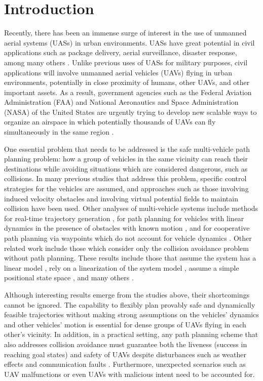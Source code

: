 \section{Introduction}
Recently, there has been an immense surge of interest in the use of unmanned aerial systems (UASs) in urban environments. UASs have great potential in civil applications such as package delivery, aerial surveillance, disaster response, among many others \cite{Tice91, Debusk10, Amazon16, AUVSI16, BBC16}. Unlike previous uses of UASs for military purposes, civil applications will involve unmanned aerial vehicles (UAVs) flying in urban environments, potentially in close proximity of humans, other UAVs, and other important assets. As a result, government agencies such as the Federal Aviation Administration (FAA) and National Aeronautics and Space Administration (NASA) of the United States are urgently trying to develop new scalable ways to organize an airspace in which potentially thousands of UAVs can fly simultaneously in the same region \cite{FAA13, Kopardekar16}.

One essential problem that needs to be addressed is the safe multi-vehicle path planning problem: how a group of vehicles in the same vicinity can reach their destinations while avoiding situations which are considered dangerous, such as collisions. In many previous studies that address this problem, specific control strategies for the vehicles are assumed, and approaches such as those involving induced velocity obstacles \cite{Fiorini98, Chasparis05, Vandenberg08,Wu2012} and involving virtual potential fields to maintain collision \cite{Olfati-Saber2002, Chuang07} have been used. Other analyses of multi-vehicle systems include methods for real-time trajectory generation \cite{Feng-LiLian2002}, for path planning for vehicles with linear dynamics in the presence of obstacles with known motion \cite{Ahmadzadeh2009}, and for cooperative path planning via waypoints which do not account for vehicle dynamics \cite{Bellingham}. Other related work include those which consider only the collision avoidance problem without path planning. These results include those that assume the system has a linear model \cite{Beard2003, Schouwenaars2004, Stipanovic2007}, rely on a linearization of the system model \cite{Massink2001, Althoff2011}, assume a simple positional state space \cite{Lin2015}, and many others \cite{Lalish2008, Hoffmann2008, Chen2016}.

Although interesting results emerge from the studies above, their shortcomings cannot be ignored. The capability to flexibly plan provably safe and dynamically feasible trajectories without making strong assumptions on the vehicles' dynamics and other vehicles' motion is essential for dense groups of UAVs flying in each other's vicinity. In addition, in a practical setting, any path planning scheme that also addresses collision avoidance must guarantee both the liveness (success in reaching goal states) and safety of UAVs despite disturbances such as weather effects and communication faults \cite{Kopardekar16}. Furthermore, unexpected scenarios such as UAV malfunctions or even UAVs with malicious intent need to be accounted for.

